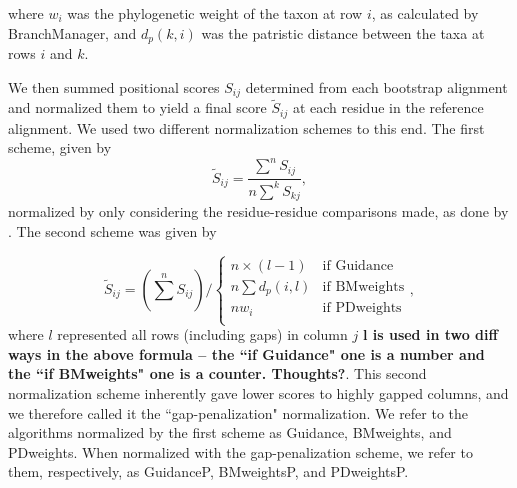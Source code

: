 \documentclass[10pt]{article}
\begin{document}
where $w_i$ was the phylogenetic weight of the taxon at row $i$, as calculated by BranchManager, and $d_p(k,i)$ was the patristic distance between the taxa at rows $i$ and $k$. 

We then summed positional scores $S_{ij}$ determined from each bootstrap alignment and normalized them to yield a final score $\widetilde{S}_{ij}$ at each residue in the reference alignment. We used two different normalization schemes to this end. The first scheme, given by \begin{equation} \widetilde{S}_{ij} = \frac{\sum\limits_{}^n S_{ij}}{n\sum\limits_{}^k S_{kj}}, \end{equation} normalized by only considering the residue-residue comparisons made, as done by \citep{Penn2010}. The second scheme was given by 

\begin{equation} \widetilde{S}_{ij} = (\sum\limits_{}^n S_{ij}) \bigg/ \left\{ \begin{array}{rl}
              n\times (l-1)                                   &\mbox{if Guidance} \\
              n\sum d_p(i,l)                         &\mbox{if BMweights} \\
   		  nw_i                                       &\mbox{if PDweights} \\          
         \end{array} \right.,
\end{equation}
where $l$ represented all rows (including gaps) in column $j$ \textbf{l is used in two diff ways in the above formula -- the ``if Guidance" one is a number and the ``if BMweights" one is a counter. Thoughts?}. This second normalization scheme inherently gave lower scores to highly gapped columns, and we therefore called it the ``gap-penalization" normalization. We refer to the algorithms normalized by the first scheme as Guidance, BMweights, and PDweights. When normalized with the gap-penalization scheme, we refer to them, respectively, as GuidanceP, BMweightsP, and PDweightsP.
\end{document}
